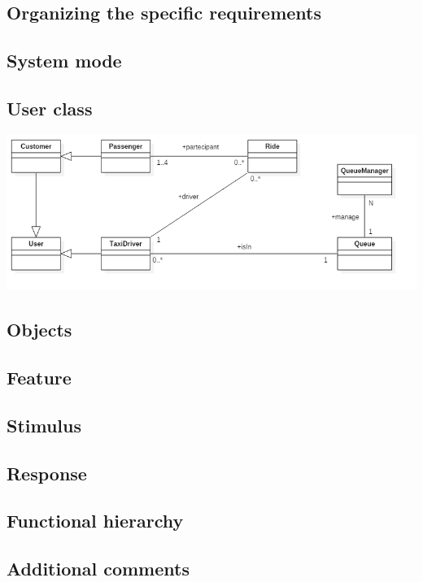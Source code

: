 \documentclass[english]{article}
\begin{document}
\subsection{Organizing the specific requirements}

\subsection{System mode}

\subsection{User class}
\includegraphics[width=\textwidth]{ClassDiagram}

\subsection{Objects}

\subsection{Feature}

\subsection{Stimulus}

\subsection{Response}

\subsection{Functional hierarchy}

\subsection{Additional comments}
\end{document}
